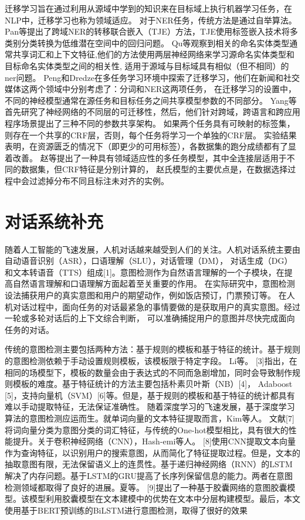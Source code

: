 迁移学习旨在通过利用从源域中学到的知识来在目标域上执行机器学习任务\cite{pan2009survey}，在NLP中，迁移学习也称为领域适应。
对于NER任务，传统方法是通过自举算法。 
Pan等提出了跨域NER的转移联合嵌入（TJE）方法，TJE使用标签嵌入技术将多类别分类转换为低维潜在空间中的回归问题\cite{pan2013transfer}。 
Qu等观察到相关的命名实体类型通常共享词汇和上下文特征\cite{qu2016named},他们的方法使用两层神经网络来学习源命名实体类型和目标命名实体类型之间的相关性,
适用于源域与目标域具有相似（但不相同）的ner问题。 
Peng和Dredze在多任务学习环境中探索了迁移学习\cite{peng2016multi}，他们在新闻和社交媒体这两个领域中分别考虑了：分词和NER这两项任务，
在迁移学习的设置中，不同的神经模型通常在源任务和目标任务之间共享模型参数的不同部分。
Yang等首先研究了神经网络的不同层的可迁移性\cite{yang2017transfer}，然后，他们针对跨域，跨语言和跨应用程序场景提出了三种不同的参数共享架构。
如果两个任务具有可映射的标签集，则存在一个共享的CRF层，否则，每个任务将学习一个单独的CRF层。
实验结果表明，在资源匮乏的情况下（即更少的可用标签），各数据集的跑分成绩都有了显着改善。 
赵等提出了一种具有领域适应性的多任务模型，其中全连接层适用于不同的数据集，但CRF特征是分别计算的，
赵氏模型的主要优点是，在数据选择过程中会过滤掉分布不同且标注未对齐的实例\cite{zhao2018improve}。




\section{对话系统补充}
随着人工智能的飞速发展，人机对话越来越受到人们的关注。人机对话系统主要由自动语音识别（ASR），口语理解（SLU），对话管理（DM），
对话生成（DG）和文本转语音（TTS）组成[1]。意图检测作为自然语言理解的一个子模块，在提高自然语言理解和口语理解方面起着至关重要的作用。
在实际研究中，意图检测设法捕获用户的真实意图和用户的期望动作，例如饭店预订，门票预订等。
在人机对话过程中，面向任务的对话最紧急的事情要做的是获取用户的真实意图。经过一轮或多轮对话后的上下文综合判断，
可以准确捕捉用户的意图并尽快完成面向任务的对话。

传统的意图检测主要包括两种方法：基于规则的模板和基于特征的统计。基于规则的意图检测依赖于手动设置规则模板，该模板限于特定字段。 Li等。 
[3]指出，在相同的场模型下，模板的数量会由于表达式的不同而急剧增加，同时会导致制作规则模板的难度。基于特征统计的方法主要包括朴素贝叶斯（NB）[4]，
Adaboost [5]，支持向量机（SVM）[6]等。但是，基于规则的模板和基于特征的统计都具有难以手动提取特征，无法保证准确性。
随着深度学习的飞速发展，基于深度学习算法的意图检测应运而生。就单词向量的文本特征提取而言，Kim等人。
文献[7]将词向量分类为意图分类的词汇特征，与传统的One-hot模型相比，具有很大的性能提升。关于卷积神经网络（CNN），Hash-emi等人。 
[8]使用CNN提取文本向量作为查询特征，以识别用户的搜索意图，从而简化了特征提取过程。但是，文本的抽取意图有限，无法保留语义上的连贯性。基于递归神经网络（RNN）的LSTM解决了内存问题。基于LSTM的GRU提高了长序列保留信息的能力。两者在意图检测领域都取得了良好的进展。夏等。 [9]提出了一种基于胶囊网络的意图胶囊模型。该模型利用胶囊模型在文本建模中的优势在文本中分层构建模型。最后，本文使用基于BERT预训练的BiLSTM进行意图检测，取得了很好的效果

